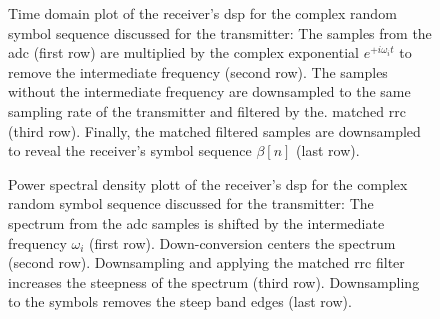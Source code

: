 \begin{figure}[htb]
	\centering
	
	\caption{Time domain plot of the receiver's \gls{dsp} for the complex random symbol sequence discussed for the transmitter: The samples from the \gls{adc} (first row) are multiplied by the complex exponential $e^{+i\omega_it}$ to remove the intermediate frequency (second row). The samples without the intermediate frequency are downsampled to the same sampling rate of the transmitter and filtered by the. matched \gls{rrc} (third row). Finally, the matched filtered samples are downsampled to reveal the receiver's symbol sequence $\beta[n]$ (last row).}
\end{figure}

\begin{figure}[htb]
	\centering
	
	\caption{Power spectral density plott of the receiver's \gls{dsp} for the complex random symbol sequence discussed for the transmitter: The spectrum from the \gls{adc} samples is shifted by the intermediate frequency $\omega_i$ (first row). Down-conversion centers the spectrum (second row). Downsampling and applying the matched \gls{rrc} filter increases the steepness of the spectrum (third row). Downsampling to the symbols removes the steep band edges (last row).}
\end{figure}